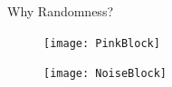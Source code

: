 \documentclass[serif]{beamer}
\begin{document}
\begin{frame}[c]{\sc Why Randomness?}

{\begin{figure}
\centering
\texttt{[image: PinkBlock]}
\label{infoTheory3}
\end{figure}
}

{\begin{figure}
\centering
\texttt{[image: NoiseBlock]}
\label{infoTheory3}
\end{figure}
}

\end{frame}




\end{document}

